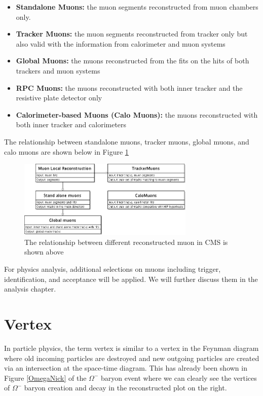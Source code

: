\begin{itemize}
\item \textbf{Standalone Muons:} the muon segments reconstructed from muon chambers only.
\item \textbf{Tracker Muons:} the muon segments reconstructed from tracker only but also valid with the information from calorimeter and muon systems
\item \textbf{Global Muons:} the muons reconstructed from the fits on the hits of both trackers and muon systems
\item \textbf{RPC Muons:} the muons reconstructed with both inner tracker and the resistive plate detector only 
\item \textbf{Calorimeter-based Muons (Calo Muons):} the muons reconstructed with both inner tracker and calorimeters  
\end{itemize}

The relationship between standalone muons, tracker muons, global muons, and calo muons are shown below in Figure \ref{MuonRel}

\begin{figure}[hbtp]
\begin{center}
\includegraphics[width=0.75\textwidth]{Figures/Chapter4/MuonRel}
\caption{The relationship between different reconstructed muon in CMS is shown above}
\label{MuonRel}
\end{center}
\end{figure} 

For physics analysis, additional selections on muons including trigger, identification, and acceptance will be applied. We will further discuss them in the analysis chapter.

\section{Vertex}

In particle physics, the term vertex is similar to a vertex in the Feynman diagram where old incoming particles are destroyed and new outgoing particles are created via an intersection at the space-time diagram. This has already been shown in Figure \ref{OmegaNick} of the $\Omega^-$ baryon event where we can clearly see the vertices of $\Omega^-$ baryon creation and decay in the reconstructed plot on the right. 


